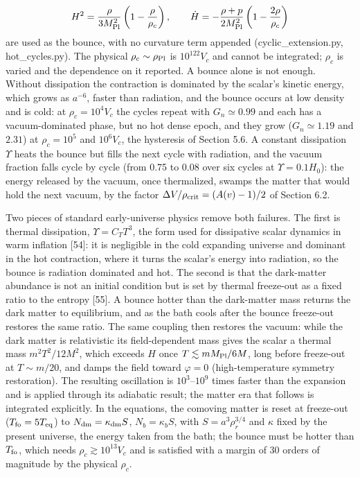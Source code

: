 \documentclass[11pt,a4paper]{article}
\begin{document}
\begin{equation}
H^2=\frac{\rho}{3M_{\rm Pl}^2}\left(1-\frac{\rho}{\rho_c}\right),\qquad \dot H=-\frac{\rho+p}{2M_{\rm Pl}^2}\left(1-\frac{2\rho}{\rho_c}\right)
\end{equation}
are used as the bounce, with no curvature term appended (cyclic\_extension.py, hot\_cycles.py). The physical $\rho_c\sim\rho_{\rm Pl}$ is $10^{122}V_c$ and cannot be integrated; $\rho_c$ is varied and the dependence on it reported. A bounce alone is not enough. Without dissipation the contraction is dominated by the scalar's kinetic energy, which grows as $a^{-6}$, faster than radiation, and the bounce occurs at low density and is cold: at $\rho_c=10^4V_c$ the cycles repeat with $G_n\simeq0.99$ and each has a vacuum-dominated phase, but no hot dense epoch, and they grow ($G_n\simeq1.19$ and $2.31$) at $\rho_c=10^5$ and $10^6V_c$, the hysteresis of Section 5.6. A constant dissipation $\Upsilon$ heats the bounce but fills the next cycle with radiation, and the vacuum fraction falls cycle by cycle (from 0.75 to 0.08 over six cycles at $\Upsilon=0.1H_0$): the energy released by the vacuum, once thermalized, swamps the matter that would hold the next vacuum, by the factor $\Delta V/\rho_{\rm crit}=(A(v)-1)/2$ of Section 6.2.

Two pieces of standard early-universe physics remove both failures. The first is thermal dissipation, $\Upsilon=C_TT^3$, the form used for dissipative scalar dynamics in warm inflation [54]: it is negligible in the cold expanding universe and dominant in the hot contraction, where it turns the scalar's energy into radiation, so the bounce is radiation dominated and hot. The second is that the dark-matter abundance is not an initial condition but is set by thermal freeze-out as a fixed ratio to the entropy [55]. A bounce hotter than the dark-matter mass returns the dark matter to equilibrium, and as the bath cools after the bounce freeze-out restores the same ratio. The same coupling then restores the vacuum: while the dark matter is relativistic its field-dependent mass gives the scalar a thermal mass $m^2T^2/12M^2$, which exceeds $H$ once $T\lesssim mM_{\rm Pl}/6M$, long before freeze-out at $T\sim m/20$, and damps the field toward $\varphi=0$ (high-temperature symmetry restoration). The resulting oscillation is $10^3$--$10^9$ times faster than the expansion and is applied through its adiabatic result; the matter era that follows is integrated explicitly. In the equations, the comoving matter is reset at freeze-out ($T_{\rm fo}=5T_{\rm eq}$) to $N_{\rm dm}=\kappa_{\rm dm}S$, $N_b=\kappa_bS$, with $S=a^3\rho_r^{3/4}$ and $\kappa$ fixed by the present universe, the energy taken from the bath; the bounce must be hotter than $T_{\rm fo}$, which needs $\rho_c\gtrsim10^{13}V_c$ and is satisfied with a margin of 30 orders of magnitude by the physical $\rho_c$.
\end{document}
